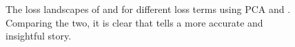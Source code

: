 \documentclass[letterpaper]{article} %
\begin{document}
\begin{figure}[htp]
              
              \caption{The loss landscapes of \cophy{} and \nn{} for different loss terms using PCA and \proposedautencoder{}. Comparing the two, it is clear that \proposedautencoder{} tells a more accurate and insightful story.}
              \label{fig:NNcophylandscape}
            \end{figure}

          

            

       


                
\end{document}
